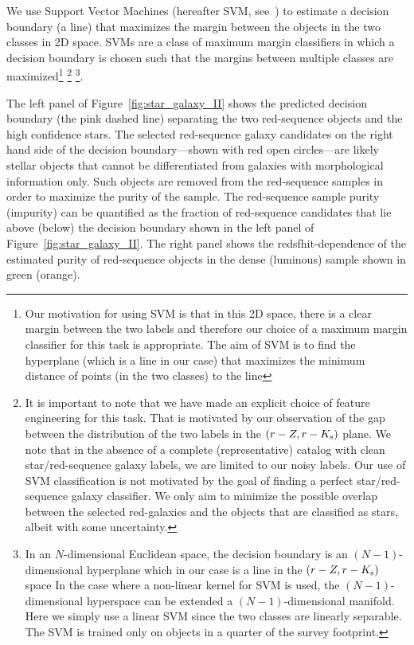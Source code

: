 \documentclass[fleqn,usenatbib,useAMS]{mnras}
\begin{document}
We use Support Vector Machines (hereafter SVM, see~\citealt{cortes1995, cristianini2000, scholkopf2000}) to estimate a decision boundary (a line) that maximizes the margin between the objects in the two classes in 2D space. SVMs are a class of maximum margin classifiers in which a decision boundary is chosen such that the margins between multiple classes are maximized\footnote{Our motivation for using SVM is that in this 2D space, there is a clear margin between the two labels and therefore our choice of a maximum margin classifier for this task is appropriate. The aim of SVM is to find the hyperplane (which is a line in our case) that maximizes the minimum distance of points (in the two classes) to the line}
\footnote{It is important to note that we have made an explicit choice of feature engineering for this task. That is motivated by our observation of the gap between the distribution of the two labels in the $(r-Z, r-K_{\rm s})$ plane. We note that in the absence of a complete (representative) catalog with clean star/red-sequence galaxy labels, we are limited to our noisy labels. Our use of SVM classification is not motivated by the goal of finding a perfect star/red-sequence galaxy classifier. We only aim to minimize the possible overlap between the selected red-galaxies and the objects that are classified as stars, albeit with some uncertainty.}
\footnote{In an $N$-dimensional Euclidean space, the decision boundary is an $(N-1)$-dimensional hyperplane which in our case is a line in the $(r-Z, r-K_{\rm s})$ space In the case where a non-linear kernel for SVM is used, the $(N-1)$-dimensional hyperspace can be extended a $(N-1)$-dimensional manifold. Here we simply use a linear SVM since the two classes are linearly separable. The SVM is trained only on objects in a quarter of the survey footprint.}.

The left panel of Figure~\ref{fig:star_galaxy_II} shows the predicted decision boundary (the pink dashed line) separating the two red-sequence objects and the high confidence stars. The selected red-sequence galaxy candidates on the right hand side of the decision boundary---shown with red open circles---are likely stellar objects that cannot be differentiated from galaxies with morphological information only. Such objects are removed from the red-sequence samples in order to maximize the purity of the sample. The red-sequence sample purity (impurity) can be quantified as the fraction of red-sequence candidates that lie above (below) the decision boundary shown in the left panel of Figure~\ref{fig:star_galaxy_II}. The right panel shows the redsfhit-dependence of the estimated purity of red-sequence objects in the dense (luminous) sample shown in green (orange).
\end{document}
